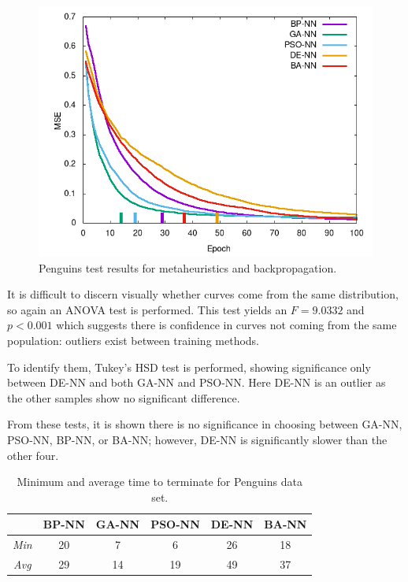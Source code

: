 \documentclass[a4paper,12pt]{article}
\begin{document}
\begin{figure}[h!]
\centering
\includegraphics[scale=0.65]{images/penguins-plot.png}
\caption{Penguins test results for metaheuristics and backpropagation.}
\label{fig:penguins}
\end{figure}

It is difficult to discern visually whether curves come from the same distribution, so again an ANOVA test is performed. This test yields an $F = 9.0332$ and $p < 0.001$ which suggests there is confidence in curves not coming from the same population: outliers exist between training methods.

To identify them, Tukey's HSD test is performed, showing significance only between DE-NN and both GA-NN and PSO-NN. Here DE-NN is an outlier as the other samples show no significant difference.

From these tests, it is shown there is no significance in choosing between GA-NN, PSO-NN, BP-NN, or BA-NN; however, DE-NN is significantly slower than the other four.

\begin{table}[h!]
\centering
\begin{tabular}{c|c|c|c|c|c|}
\cline{2-6}
 & \textbf{BP-NN} & \textbf{GA-NN} & \textbf{PSO-NN} & \textbf{DE-NN} & \textbf{BA-NN} \\ \hline
\multicolumn{1}{|c|}{\textit{Min}} & \cellcolor[HTML]{FFFFFF}20 & \cellcolor[HTML]{FFFFFF}7 & \cellcolor[HTML]{C5F1BF}6 & \cellcolor[HTML]{FFCCC9}26 & \cellcolor[HTML]{FFFFFF}18 \\ \hline
\multicolumn{1}{|c|}{\textit{Avg}} & \cellcolor[HTML]{FFFFFF}29 & \cellcolor[HTML]{C5F1BF}14 & \cellcolor[HTML]{FFFFFF}19 & \cellcolor[HTML]{FFCCC9}49 & \cellcolor[HTML]{FFFFFF}37 \\ \hline
\end{tabular}
\caption{Minimum and average time to terminate for Penguins data set.}
\label{Tab:penguins-min}
\end{table}
\end{document}
